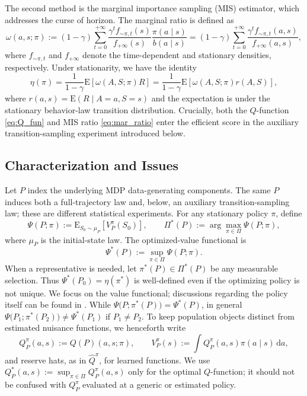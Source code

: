 \documentclass[12pt]{article}
\theoremstyle{remark}\newtheorem{remark}[theorem]{Remark}\theoremstyle{plain}
\newcommand{\E}{\mathrm{E}}
\begin{document}
The second method is the marginal importance sampling (MIS) estimator, which addresses the curse of horizon. The marginal ratio is defined as
\begin{equation}\label{eq:mar_ratio}
    \omega(a, s ; \pi) := (1 - \gamma) \sum_{t = 0}^{+ \infty}  \frac{\gamma^t f_{\sim \pi, t}(s)}{f_{+ \infty} (s)} \frac{\pi(a \mid s)}{b(a \mid s)} = (1 - \gamma) \sum_{t = 0}^{+ \infty}  \frac{\gamma^t f_{\sim \pi, t}(a, s)}{f_{+ \infty} (a, s)},
\end{equation}
where $f_{\sim \pi, t}$ and $f_{+ \infty}$ denote the time-dependent and stationary densities, respectively. Under stationarity, we have the identity 
\[
    \eta(\pi)
    =\frac{1}{1-\gamma}\E\!\left[\omega(A,S;\pi)R\right]
    =\frac{1}{1-\gamma}
    \E\!\left[\omega(A,S;\pi)r(A,S)\right],
\]
where $r(a,s)=\E(R\mid A=a,S=s)$ and the expectation is under the
stationary behavior-law transition distribution.
Crucially, both the $Q$-function \eqref{eq:Q_fun} and MIS ratio
\eqref{eq:mar_ratio} enter the efficient score in the auxiliary
transition-sampling experiment introduced below.

\subsection{Characterization and Issues}

Let $P$ index the underlying MDP data-generating components.  The same
$P$ induces both a full-trajectory law and, below, an auxiliary
transition-sampling law; these are different statistical experiments.
For any stationary policy $\pi$, define
\[
    \Psi(P;\pi)
    :=\E_{S_0\sim\mu_P}\!\left[V_P^\pi(S_0)\right],
    \qquad
    \Pi^*(P):=\arg\max_{\pi\in\Pi}\Psi(P;\pi),
\]
where $\mu_P$ is the initial-state law.  The optimized-value
functional is
\[
    \Psi^*(P):=\sup_{\pi\in\Pi}\Psi(P;\pi).
\]
When a representative is needed, let
$\pi^*(P)\in\Pi^*(P)$ be any measurable selection.  Thus
$\Psi^*(P_0)=\eta(\pi^*)$ is well-defined even if the optimizing
policy is not unique. We focus on the value functional; discussions
regarding the policy itself can be found in
\cite{kosorok2019precision,athey2021policy,luo2024policy}.
While $\Psi\big(P; \pi^*(P)\big) = \Psi^*(P)$, in general $\Psi\big(P_1; \pi^*(P_2)\big) \neq \Psi^*(P_1)$ if $P_1 \neq P_2$.
To keep population objects distinct from estimated nuisance functions, we henceforth write
\[
    Q_P^\pi(a,s) := Q(P)(a,s;\pi), \qquad
    V_P^\pi(s) := \int Q_P^\pi(a,s)\pi(a\mid s)\,\mathrm{d}a,
\]
and reserve hats, as in $\widehat Q^\pi$, for learned functions.  We use
$Q_P^*(a,s) := \sup_{\pi\in\Pi}Q_P^\pi(a,s)$ only for the optimal
$Q$-function; it should not be confused with $Q_P^\pi$ evaluated at a
generic or estimated policy.%
\end{document}
